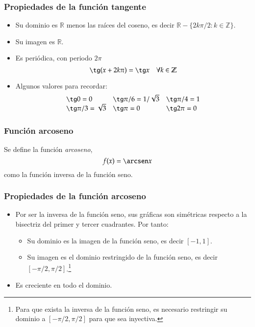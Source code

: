 	
	\begin{frame}
		\frametitle{Propiedades de la función tangente}
		\begin{itemize}
			\item Su dominio es $\mathbb{R}$ menos las raíces del coseno, es decir $\mathbb{R}-\{2k\pi/2: k\in \mathbb{Z}\}$.
			\item Su imagen es $\mathbb{R}$.
			\item Es periódica, con periodo $2\pi$
			      \[\tg (x+2k\pi)= \tg x\quad \forall k\in \mathbb{Z}\]
			\item Algunos valores para recordar:
			      \[
			      	\begin{array}{lll}
			      		\tg 0=0             & \tg \pi/6= 1/\sqrt{3} & \tg \pi/4=1 \\
			      		\tg \pi/3= \sqrt{3} & \tg \pi =0            & \tg 2\pi=0  
			      	\end{array}
			      \]
		\end{itemize}
	\end{frame} 
	
	
	\begin{frame}
		\frametitle{Función arcoseno}
		\begin{definicion}
			Se define la función \emph{arcoseno},
			\[f(x)=\arcsen x\]
			como la función inversa de la función seno.
		\end{definicion}
		\begin{center}
			\scalebox{1}{}
		\end{center}
	\end{frame} 
	
	
	
	\begin{frame}
		\frametitle{Propiedades de la función arcoseno}
		\begin{itemize}
			\item Por ser la inversa de la función seno, sus gráficas son simétricas respecto a la bisectriz del primer y tercer
			      cuadrantes. Por tanto:
			      \begin{itemize}
			      	\item Su dominio es la imagen de la función seno, es decir $[-1,1]$.
			      	\item Su imagen es el dominio restringido de la función seno, es decir $[-\pi/2,\pi/2]$.\footnote{Para que exista la
			      		      inversa de la función seno, es necesario restringir su dominio a $[-\pi/2,\pi/2]$ para que sea inyectiva.}
			      	\end{itemize}
			      	\item Es creciente en todo el dominio.
			      \end{itemize}
		\end{frame} 
		
